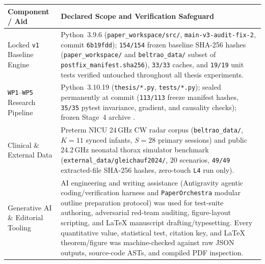 \vspace{0.30cm}
\noindent\begin{minipage}{\textwidth}
  \centering
  \singlespacing
  \footnotesize
  \label{tab:ai_software_provenance}
  \begin{tabularx}{\textwidth}{@{}>{\raggedright\arraybackslash}p{3.6cm} >{\raggedright\arraybackslash}X@{}}
    \toprule
    \textbf{Component / Aid} & \textbf{Declared Scope and Verification Safeguard} \\
    \midrule
    Locked \texttt{v1} Baseline Engine &
    Python~3.9.6 (\texttt{paper\_\allowbreak workspace/\allowbreak src/}, \texttt{main-v3-audit-fix-2}, commit \texttt{6b19fdd}); \texttt{154/154} frozen baseline SHA-256 hashes (\texttt{paper\_\allowbreak workspace/} and \texttt{beltrao\_\allowbreak data/} subset of \texttt{postfix\_\allowbreak manifest.sha256}), \texttt{33/33} caches, and \texttt{19/19} unit tests verified untouched throughout all thesis experiments. \\
    \addlinespace[3pt]
    \texttt{WP1}--\texttt{WP5} Research Pipeline &
    Python~3.10.19 (\texttt{thesis/*.py}, \texttt{tests/*.py}); sealed permanently at commit \FrozenGitCommit{} (\texttt{113/113} freeze manifest hashes, \texttt{35/35} pytest invariance, gradient, and causality checks); frozen Stage~4 archive \FrozenArchiveHash{}. \\
    \addlinespace[3pt]
    Clinical \& External Data &
    Preterm NICU 24\,GHz CW radar corpus (\texttt{beltrao\_data/}, $K=11$ synced infants, $S=28$ primary sessions) and public 24.2\,GHz neonatal thorax simulator benchmark (\texttt{external\_\allowbreak data/\allowbreak gleichauf2024/}, $20$ scenarios, \texttt{49/49} extracted-file SHA-256 hashes, zero-touch \texttt{L4} run only). \\
    \addlinespace[3pt]
    Generative AI \& Editorial Tooling &
    AI engineering and writing assistance (Antigravity agentic coding/verification harness and \texttt{PaperOrchestra} modular outline preparation protocol) was used for test-suite authoring, adversarial red-team auditing, figure-layout scripting, and LaTeX manuscript drafting/typesetting. Every quantitative value, statistical test, citation key, and LaTeX theorem/figure was machine-checked against raw JSON outputs, source-code ASTs, and compiled PDF inspection. \\
    \bottomrule
  \end{tabularx}
\end{minipage}
\cleardoublepage
